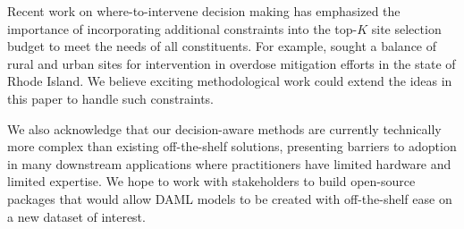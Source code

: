 
Recent work on where-to-intervene decision making has emphasized the importance of incorporating additional constraints into the top-$K$ site selection budget to meet the needs of all constituents. For example, \citet{marshallPreventingOverdoseUsing2022} sought a balance of rural and urban sites for intervention in overdose mitigation efforts in the state of Rhode Island. We believe exciting methodological work could extend the ideas in this paper to handle such constraints. 


We also acknowledge that our decision-aware methods are currently technically more complex than existing off-the-shelf solutions, presenting barriers to adoption in many downstream applications where practitioners have limited hardware and limited expertise. We hope to work with stakeholders to build open-source packages that would allow DAML models to be created with off-the-shelf ease on a new dataset of interest.
